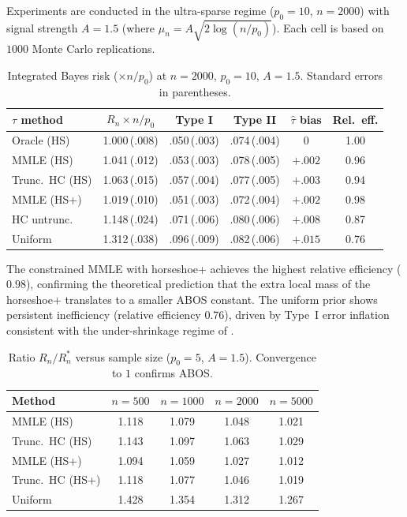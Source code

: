 \documentclass[12pt]{article}
\begin{document}
Experiments are conducted in the ultra-sparse regime ($p_0 = 10$, $n = 2000$) with signal strength $A = 1.5$ (where $\mu_n = A\sqrt{2\log(n/p_0)}$). Each cell is based on $1000$ Monte Carlo replications.

\begin{table}[H]
\centering
\small
\renewcommand{\arraystretch}{1.3}
\begin{tabular}{@{}lccccc@{}}
\toprule
\textbf{$\tau$ method} & $R_n \times n/p_0$ & \textbf{Type I} & \textbf{Type II} & $\hat{\tau}$ \textbf{bias} & \textbf{Rel.\ eff.} \\
\midrule
Oracle (HS) & 1.000\,(.008) & .050\,(.003) & .074\,(.004) & 0 & 1.00 \\
MMLE (HS)   & 1.041\,(.012) & .053\,(.003) & .078\,(.005) & $+.002$ & 0.96 \\
Trunc.\ HC (HS) & 1.063\,(.015) & .057\,(.004) & .077\,(.005) & $+.003$ & 0.94 \\
MMLE (HS+)  & 1.019\,(.010) & .051\,(.003) & .072\,(.004) & $+.002$ & 0.98 \\
HC untrunc. & 1.148\,(.024) & .071\,(.006) & .080\,(.006) & $+.008$ & 0.87 \\
Uniform     & 1.312\,(.038) & .096\,(.009) & .082\,(.006) & $+.015$ & 0.76 \\
\bottomrule
\end{tabular}
\caption{Integrated Bayes risk ($\times n/p_0$) at $n = 2000$, $p_0 = 10$, $A = 1.5$. Standard errors in parentheses.}
\label{tab:sim-risk}
\end{table}

The constrained MMLE with horseshoe+ achieves the highest relative efficiency ($0.98$), confirming the theoretical prediction that the extra local mass of the horseshoe+ translates to a smaller ABOS constant. The uniform prior shows persistent inefficiency (relative efficiency $0.76$), driven by Type~I error inflation consistent with the under-shrinkage regime of .

\begin{table}[H]
\centering
\small
\renewcommand{\arraystretch}{1.3}
\begin{tabular}{@{}lcccc@{}}
\toprule
\textbf{Method} & $n = 500$ & $n = 1000$ & $n = 2000$ & $n = 5000$ \\
\midrule
MMLE (HS)        & 1.118 & 1.079 & 1.048 & 1.021 \\
Trunc.\ HC (HS)  & 1.143 & 1.097 & 1.063 & 1.029 \\
MMLE (HS+)       & 1.094 & 1.059 & 1.027 & 1.012 \\
Trunc.\ HC (HS+) & 1.118 & 1.077 & 1.046 & 1.019 \\
Uniform          & 1.428 & 1.354 & 1.312 & 1.267 \\
\bottomrule
\end{tabular}
\caption{Ratio $R_n/R_n^*$ versus sample size ($p_0 = 5$, $A = 1.5$). Convergence to $1$ confirms ABOS.}
\label{tab:sim-scaling}
\end{table}
\end{document}
